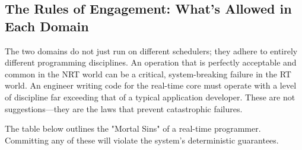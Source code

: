 \subsection{The Rules of Engagement: What's Allowed in Each Domain}
\label{subsec:domain_rules}

The two domains do not just run on different schedulers; they adhere to entirely different programming disciplines. An operation that is perfectly acceptable and common in the NRT world can be a critical, system-breaking failure in the RT world. An engineer writing code for the real-time core must operate with a level of discipline far exceeding that of a typical application developer. These are not suggestions—they are the laws that prevent catastrophic failures.

The table below outlines the "Mortal Sins" of a real-time programmer. Committing any of these will violate the system's deterministic guarantees.

